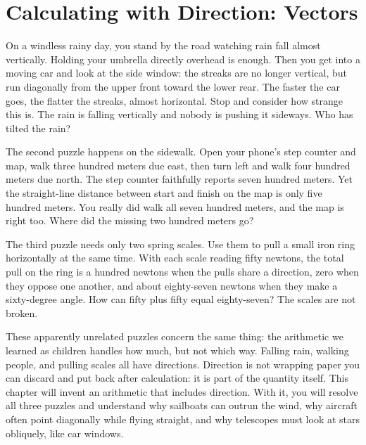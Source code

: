 \chapter{Calculating with Direction: Vectors}


\begin{mainline}
On a windless rainy day, you stand by the road watching rain fall almost vertically. Holding your umbrella directly overhead is enough. Then you get into a moving car and look at the side window: the streaks are no longer vertical, but run diagonally from the upper front toward the lower rear. The faster the car goes, the flatter the streaks, almost horizontal. Stop and consider how strange this is. The rain is falling vertically and nobody is pushing it sideways. Who has tilted the rain?

The second puzzle happens on the sidewalk. Open your phone's step counter and map, walk three hundred meters due east, then turn left and walk four hundred meters due north. The step counter faithfully reports seven hundred meters. Yet the straight-line distance between start and finish on the map is only five hundred meters. You really did walk all seven hundred meters, and the map is right too. Where did the missing two hundred meters go?

The third puzzle needs only two spring scales. Use them to pull a small iron ring horizontally at the same time. With each scale reading fifty newtons, the total pull on the ring is a hundred newtons when the pulls share a direction, zero when they oppose one another, and about eighty-seven newtons when they make a sixty-degree angle. How can fifty plus fifty equal eighty-seven? The scales are not broken.

These apparently unrelated puzzles concern the same thing: the arithmetic we learned as children handles how much, but not which way. Falling rain, walking people, and pulling scales all have directions. Direction is not wrapping paper you can discard and put back after calculation: it is part of the quantity itself. This chapter will invent an arithmetic that includes direction. With it, you will resolve all three puzzles and understand why sailboats can outrun the wind, why aircraft often point diagonally while flying straight, and why telescopes must look at stars obliquely, like car windows.
\end{mainline}



